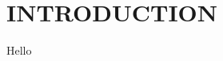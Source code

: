 \documentclass[twocolumn]{aastex62}
\begin{document}

\section{INTRODUCTION}
Hello


\keywords{}

\end{document}
